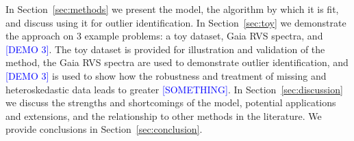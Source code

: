 \documentclass[onecolumn,floatfix]{aastex631}
\newcommand{\placeholder}[1]{\textcolor{blue}{[#1]}}
\begin{document}
In Section~\ref{sec:methods} we present the model, the algorithm by which it is fit, and discuss using it for outlier identification.
In Section~\ref{sec:toy} we demonstrate the approach on 3 example problems: a toy dataset, Gaia RVS spectra, and \placeholder{DEMO 3}.
The toy dataset is provided for illustration and validation of the method, the Gaia RVS spectra are used to demonstrate outlier identification, and \placeholder{DEMO 3} is used to show how the robustness and treatment of missing and heteroskedastic data leads to greater \placeholder{SOMETHING}.
In Section~\ref{sec:discussion} we discuss the strengths and shortcomings of the model, potential applications and extensions, and the relationship to other methods in the literature.
We provide conclusions in Section~\ref{sec:conclusion}.


\end{document}
